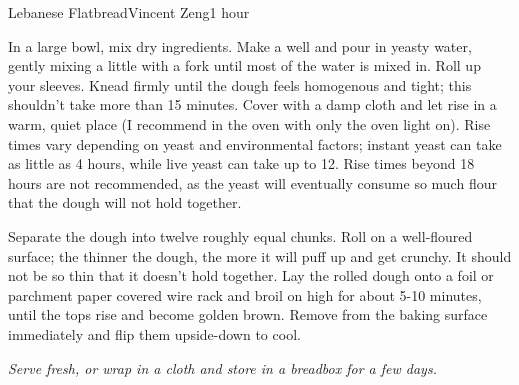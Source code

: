 \begin{recipe}{Lebanese Flatbread}{Vincent Zeng}{1 hour}

	In a large bowl, mix dry ingredients. Make a well and pour in yeasty water, gently mixing a little with a fork until most of the water is mixed in. Roll up your sleeves. Knead firmly until the dough feels homogenous and tight; this shouldn't take more than 15 minutes. Cover with a damp cloth and let rise in a warm, quiet place (I recommend in the oven with only the oven light on). Rise times vary depending on yeast and environmental factors; instant yeast can take as little as 4 hours, while live yeast can take up to 12. Rise times beyond 18 hours are not recommended, as the yeast will eventually consume so much flour that the dough will not hold together.

	Separate the dough into twelve roughly equal chunks. Roll on a well-floured surface; the thinner the dough, the more it will puff up and get crunchy. It should not be so thin that it doesn't hold together. Lay the rolled dough onto a foil or parchment paper covered wire rack and broil on high for about 5-10 minutes, until the tops rise and become golden brown. Remove from the baking surface immediately and flip them upside-down to cool.
\end{recipe}
\textit{Serve fresh, or wrap in a cloth and store in a breadbox for a few days.}
